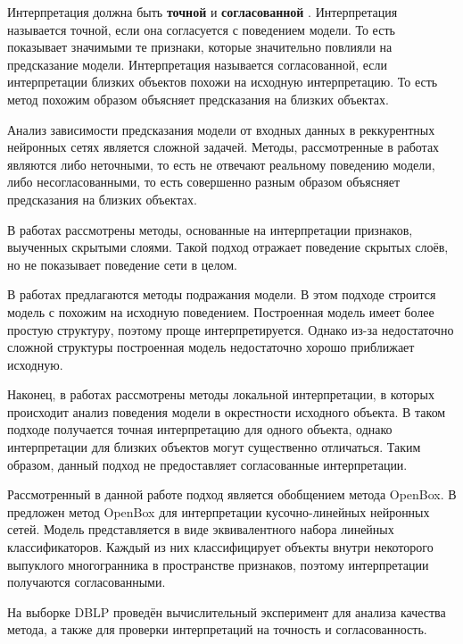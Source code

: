 \documentclass[12pt]{article}
\begin{document}
Интерпретация должна быть \textbf{точной} и \textbf{согласованной} \cite{chu2019exact}. Интерпретация называется точной, если она согласуется с поведением модели. То есть показывает значимыми те признаки, которые значительно повлияли на предсказание модели. Интерпретация называется согласованной, если интерпретации близких объектов похожи на исходную интерпретацию. То есть метод похожим образом объясняет предсказания на близких объектах.

Анализ зависимости предсказания модели от входных данных в реккурентных нейронных сетях является сложной задачей. Методы, рассмотренные в работах \cite{dosovitskiy2016inverting} \cite{zhou2018interpreting} \cite{NIPS2014_ea8fcd92} \cite{bastani2019interpreting} \cite{zhou2015learning} \cite{simonyan2014deep} являются либо неточными, то есть не отвечают реальному поведению модели, либо несогласованными, то есть совершенно разным образом объясняет предсказания на близких объектах.

В работах \cite{dosovitskiy2016inverting} \cite{zhou2018interpreting} рассмотрены методы, основанные на интерпретации признаков, выученных скрытыми слоями. Такой подход отражает поведение скрытых слоёв, но не показывает поведение сети в целом.

В работах \cite{NIPS2014_ea8fcd92} \cite{bastani2019interpreting} предлагаются методы подражания модели. В этом подходе строится модель с похожим на исходную поведением. Построенная модель имеет более простую структуру, поэтому проще интерпретируется. Однако из-за недостаточно сложной структуры построенная модель недостаточно хорошо приближает исходную.

Наконец, в работах \cite{zhou2015learning} \cite{simonyan2014deep} рассмотрены методы локальной интерпретации, в которых происходит анализ поведения модели в окрестности исходного объекта. В таком подходе получается точная интерпретацию для одного объекта, однако интерпретации для близких объектов могут существенно отличаться. Таким образом, данный подход не предоставляет согласованные интерпретации.

Рассмотренный в данной работе подход является обобщением метода OpenBox. В \cite{chu2019exact} предложен метод OpenBox для интерпретации кусочно-линейных нейронных сетей. Модель представляется в виде эквивалентного набора линейных классификаторов. Каждый из них классифицирует объекты внутри некоторого выпуклого многогранника в пространстве признаков, поэтому интерпретации получаются согласованными.

На выборке DBLP проведён вычислительный эксперимент для анализа качества метода, а также для проверки интерпретаций на точность и согласованность. 
\end{document}
